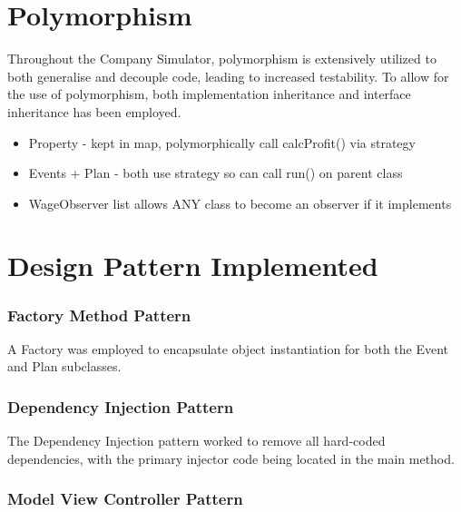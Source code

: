 \documentclass[]{article}
\begin{document}

\vspace*{0.8cm}
\section*{Polymorphism}

Throughout the Company Simulator, polymorphism is extensively utilized to both generalise and decouple code, leading to increased testability. To allow for the use of polymorphism, both implementation inheritance and interface inheritance has been employed.

\begin{itemize}
	\item Property - kept in map, polymorphically call calcProfit() via strategy
	\item Events + Plan - both use strategy so can call run() on parent class
	\item WageObserver list allows ANY class to become an observer if it implements
\end{itemize}


\section*{Design Pattern Implemented}

\subsubsection*{Factory Method Pattern}

A Factory was employed to encapsulate object instantiation for both the Event and Plan subclasses.

\subsubsection*{Dependency Injection Pattern}

The Dependency Injection pattern worked to remove all hard-coded dependencies, with the primary injector code being located in the main method.

\subsubsection*{Model View Controller Pattern}
\end{document}
